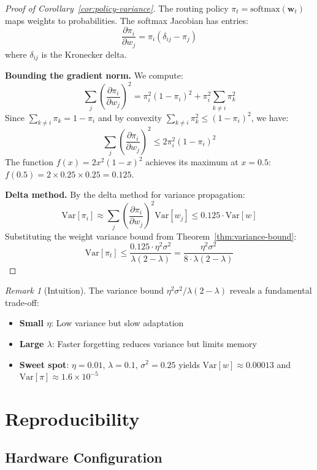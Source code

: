 \documentclass[11pt,a4paper]{article}
\theoremstyle{definition}
\theoremstyle{remark}
\newtheorem{remark}{Remark}[section]
\begin{document}
\begin{proof}[Proof of Corollary~\ref{cor:policy-variance}]
The routing policy $\pi_t = \text{softmax}(\mathbf{w}_t)$ maps weights to probabilities. The softmax Jacobian has entries:
\[
\frac{\partial \pi_i}{\partial w_j} = \pi_i(\delta_{ij} - \pi_j)
\]
where $\delta_{ij}$ is the Kronecker delta.

\textbf{Bounding the gradient norm.} We compute:
\[
\sum_j \left(\frac{\partial \pi_i}{\partial w_j}\right)^2 = \pi_i^2(1-\pi_i)^2 + \pi_i^2 \sum_{k \neq i} \pi_k^2
\]
Since $\sum_{k \neq i} \pi_k = 1 - \pi_i$ and by convexity $\sum_{k \neq i} \pi_k^2 \leq (1-\pi_i)^2$, we have:
\[
\sum_j \left(\frac{\partial \pi_i}{\partial w_j}\right)^2 \leq 2\pi_i^2(1-\pi_i)^2
\]
The function $f(x) = 2x^2(1-x)^2$ achieves its maximum at $x = 0.5$: $f(0.5) = 2 \times 0.25 \times 0.25 = 0.125$.

\textbf{Delta method.} By the delta method for variance propagation:
\[
\text{Var}[\pi_i] \approx \sum_j \left(\frac{\partial \pi_i}{\partial w_j}\right)^2 \text{Var}[w_j] \leq 0.125 \cdot \text{Var}[w]
\]
Substituting the weight variance bound from Theorem~\ref{thm:variance-bound}:
\[
\text{Var}[\pi_t] \leq \frac{0.125 \cdot \eta^2 \sigma^2}{\lambda(2-\lambda)} = \frac{\eta^2 \sigma^2}{8 \cdot \lambda(2-\lambda)}
\]
\end{proof}

\begin{remark}[Intuition]
The variance bound $\eta^2\sigma^2 / \lambda(2-\lambda)$ reveals a fundamental trade-off:
\begin{itemize}
    \item \textbf{Small $\eta$}: Low variance but slow adaptation
    \item \textbf{Large $\lambda$}: Faster forgetting reduces variance but limits memory
    \item \textbf{Sweet spot}: $\eta = 0.01$, $\lambda = 0.1$, $\sigma^2 = 0.25$ yields $\text{Var}[w] \approx 0.00013$ and $\text{Var}[\pi] \approx 1.6 \times 10^{-5}$
\end{itemize}
\end{remark}

\section{Reproducibility}
\label{sec:reproducibility}

\subsection{Hardware Configuration}
\end{document}
